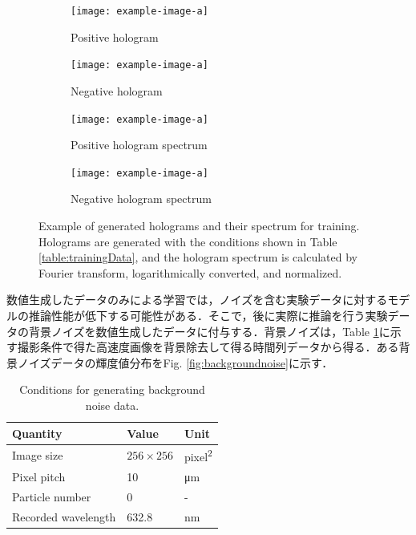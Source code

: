 \begin{figure}[htbp]
    \centering
    \begin{subfigure}[t]{0.45\linewidth}
        \texttt{[image: example-image-a]}
        \caption{Positive hologram}
        \label{fig:trainingData:posiholo}
    \end{subfigure}
    \hfill
    \begin{subfigure}[t]{0.45\linewidth}
        \texttt{[image: example-image-a]}
        \caption{Negative hologram}
        \label{fig:trainingData:negaholo}
    \end{subfigure}

    \begin{subfigure}[t]{0.45\linewidth}
        \texttt{[image: example-image-a]}
        \caption{Positive hologram spectrum}
        \label{fig:trainingData:posispec}
    \end{subfigure}
    \hfill
    \begin{subfigure}[t]{0.45\linewidth}
        \texttt{[image: example-image-a]}
        \caption{Negative hologram spectrum}
        \label{fig:trainingData:negaspec}
    \end{subfigure}

    \caption{Example of generated holograms and their spectrum for training. Holograms are generated with the conditions shown in Table \ref{table:trainingData}, and the hologram spectrum is calculated by Fourier transform, logarithmically converted, and normalized.} 
    \label{fig:trainingData}
\end{figure}

数値生成したデータのみによる学習では，ノイズを含む実験データに対するモデルの推論性能が低下する可能性がある．そこで，後に実際に推論を行う実験データの背景ノイズを数値生成したデータに付与する．背景ノイズは，Table \ref{table:backgroundnoisecondition}に示す撮影条件で得た高速度画像を背景除去して得る時間列データから得る．ある背景ノイズデータの輝度値分布をFig. \ref{fig:backgroundnoise}に示す．

\begin{table}[H]
    \centering
    \caption{Conditions for generating background noise data.}
    \label{table:backgroundnoisecondition}
    \begin{tabular}{lll}
    Quantity & Value & Unit \\ \hline \hline
    Image size & $\num{256} \times \num{256}$ & \si{pixel\squared} \\ \hline
    Pixel pitch & \num{10} & \si{\um} \\ \hline
    Particle number & 0 & - \\ \hline
    Recorded wavelength & \num{632.8} & \si{\nm} \\ \hline
    \end{tabular}
\end{table}

